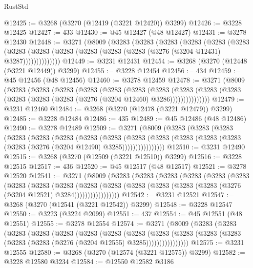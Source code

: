 \begin{lexlean}{RustStd}
\begin{coremodule}
@12425 := @3268 (@3270 (@12419 (@3221 @12420)) @3299)
@12426 := @3228 @12425
@12427 := 433
@12430 := @45 @12427 (@48 @12427)
@12431 := @3278 @12430
@12448 := @3271
    (@8009
      (@3283
        (@3283
          (@3283
            (@3283
              (@3283
                (@3283
                  (@3283
                    (@3283 (@3283 (@3283 (@3283 (@3283 (@3276 (@3204 @12431) @3287))))))))))))))
@12449 := @3231 @12431
@12454 := @3268 (@3270 (@12448 (@3221 @12449)) @3299)
@12455 := @3228 @12454
@12456 := 434
@12459 := @45 @12456 (@48 @12456)
@12460 := @3278 @12459
@12478 := @3271
    (@8009
      (@3283
        (@3283
          (@3283
            (@3283
              (@3283
                (@3283
                  (@3283
                    (@3283
                      (@3283 (@3283 (@3283 (@3283 (@3283 (@3276 (@3204 @12460) @3286)))))))))))))))
@12479 := @3231 @12460
@12484 := @3268 (@3270 (@12478 (@3221 @12479)) @3299)
@12485 := @3228 @12484
@12486 := 435
@12489 := @45 @12486 (@48 @12486)
@12490 := @3278 @12489
@12509 := @3271
    (@8009
      (@3283
        (@3283
          (@3283
            (@3283
              (@3283
                (@3283
                  (@3283
                    (@3283
                      (@3283
                        (@3283
                          (@3283 (@3283 (@3283 (@3283 (@3276 (@3204 @12490) @3285))))))))))))))))
@12510 := @3231 @12490
@12515 := @3268 (@3270 (@12509 (@3221 @12510)) @3299)
@12516 := @3228 @12515
@12517 := 436
@12520 := @45 @12517 (@48 @12517)
@12521 := @3278 @12520
@12541 := @3271
    (@8009
      (@3283
        (@3283
          (@3283
            (@3283
              (@3283
                (@3283
                  (@3283
                    (@3283
                      (@3283
                        (@3283
                          (@3283
                            (@3283 (@3283 (@3283 (@3283 (@3276 (@3204 @12521) @3284)))))))))))))))))
@12542 := @3231 @12521
@12547 := @3268 (@3270 (@12541 (@3221 @12542)) @3299)
@12548 := @3228 @12547
@12550 := @3223 (@3224 @2099)
@12551 := 437
@12554 := @45 @12551 (@48 @12551)
@12555 := @3278 @12554
@12574 := @3271
    (@8009
      (@3283
        (@3283
          (@3283
            (@3283
              (@3283
                (@3283
                  (@3283
                    (@3283
                      (@3283
                        (@3283
                          (@3283 (@3283 (@3283 (@3283 (@3276 (@3204 @12555) @3285))))))))))))))))
@12575 := @3231 @12555
@12580 := @3268 (@3270 (@12574 (@3221 @12575)) @3299)
@12582 := @3228 @12580 @3234
@12584 := @12550 @12582 @3186

\end{coremodule}
\end{lexlean}
